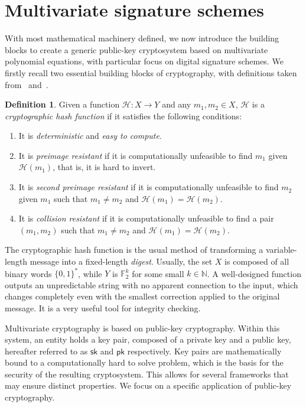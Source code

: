 \documentclass[12pt, a4paper, oneside]{memoir}
\theoremstyle{definition}
\newtheorem{definition}[theorem]{Definition}
\begin{document}
\section{Multivariate signature schemes}\label{sec:mult}

With most mathematical machinery defined, we now introduce the building blocks to create a generic public-key cryptosystem based on multivariate polynomial equations, with particular focus on digital signature schemes. We firstly recall two essential building blocks of cryptography, with definitions taken from~\cite[Section 7.1]{Gathen:2015} and~\cite[Section 6.1]{Goldreich:2004}.

\begin{definition}
  Given a function $\mathcal{H} : X \to Y$ and any $m_{1}, m_{2} \in X$, $\mathcal{H}$ is a \emph{cryptographic hash function} if it satisfies the following conditions:
  
  \begin{enumerate}
    \item It is \emph{deterministic} and \emph{easy to compute}.
    \item It is \emph{preimage resistant} if it is computationally unfeasible to find $m_{1}$ given $\mathcal{H}(m_{1})$, that is, it is hard to invert.
    \item It is \emph{second preimage resistant} if it is computationally unfeasible to find $m_{2}$ given $m_{1}$ such that $m_{1} \neq m_{2}$ and $\mathcal{H}(m_{1}) = \mathcal{H}(m_{2})$.
    \item It is \emph{collision resistant} if it is computationally unfeasible to find a pair $(m_{1}, m_{2})$ such that $m_{1} \neq m_{2}$ and $\mathcal{H}(m_{1}) = \mathcal{H}(m_{2})$.
  \end{enumerate}
\end{definition}

The cryptographic hash function is the usual method of transforming a variable-length message into a fixed-length \emph{digest}. Usually, the set $X$ is composed of all binary words $\{0, 1\}^{*}$, while $Y$ is $\mathbb{F}_{2}^{k}$ for some small $k \in \mathbb{N}$. A well-designed function outputs an unpredictable string with no apparent connection to the input, which changes completely even with the smallest correction applied to the original message. It is a very useful tool for integrity checking.

Multivariate cryptography is based on public-key cryptography. Within this system, an entity holds a key pair, composed of a private key and a public key, hereafter referred to as $\mathsf{sk}$ and $\mathsf{pk}$ respectively. Key pairs are mathematically bound to a computationally hard to solve problem, which is the basis for the security of the resulting cryptosystem. This allows for several frameworks that may ensure distinct properties. We focus on a specific application of public-key cryptography.
\end{document}
